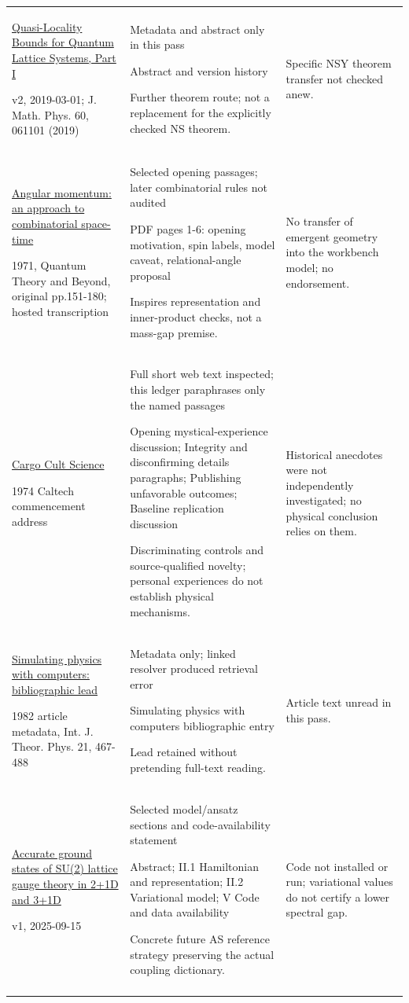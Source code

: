 \begin{longtable}{@{}p{43mm}p{65mm}p{44mm}@{}}
\href{https://arxiv.org/abs/1810.02428v2}{Quasi-Locality Bounds for Quantum Lattice Systems, Part I}\par v2, 2019-03-01; J. Math. Phys. 60, 061101 (2019) & Metadata and abstract only in this pass\par Abstract and version history\par Further theorem route; not a replacement for the explicitly checked NS theorem. & Specific NSY theorem transfer not checked anew.\\\addlinespace
\href{https://math.ucr.edu/home/baez/penrose/Penrose-AngularMomentum.pdf}{Angular momentum: an approach to combinatorial space-time}\par 1971, Quantum Theory and Beyond, original pp.151-180; hosted transcription & Selected opening passages; later combinatorial rules not audited\par PDF pages 1-6: opening motivation, spin labels, model caveat, relational-angle proposal\par Inspires representation and inner-product checks, not a mass-gap premise. & No transfer of emergent geometry into the workbench model; no endorsement.\\\addlinespace
\href{https://calteches.library.caltech.edu/51/2/CargoCult.htm}{Cargo Cult Science}\par 1974 Caltech commencement address & Full short web text inspected; this ledger paraphrases only the named passages\par Opening mystical-experience discussion; Integrity and disconfirming details paragraphs; Publishing unfavorable outcomes; Baseline replication discussion\par Discriminating controls and source-qualified novelty; personal experiences do not establish physical mechanisms. & Historical anecdotes were not independently investigated; no physical conclusion relies on them.\\\addlinespace
\href{https://feeds.library.caltech.edu/people/Feynman-R-P/article.html}{Simulating physics with computers: bibliographic lead}\par 1982 article metadata, Int. J. Theor. Phys. 21, 467-488 & Metadata only; linked resolver produced retrieval error\par Simulating physics with computers bibliographic entry\par Lead retained without pretending full-text reading. & Article text unread in this pass.\\\addlinespace
\href{https://arxiv.org/html/2509.12323v1}{Accurate ground states of SU(2) lattice gauge theory in 2+1D and 3+1D}\par v1, 2025-09-15 & Selected model/ansatz sections and code-availability statement\par Abstract; II.1 Hamiltonian and representation; II.2 Variational model; V Code and data availability\par Concrete future AS reference strategy preserving the actual coupling dictionary. & Code not installed or run; variational values do not certify a lower spectral gap.\\\addlinespace

\end{longtable}
